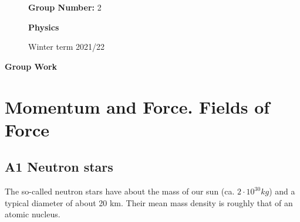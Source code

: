 \documentclass[10pt,ngerman]{scrartcl}
\begin{document}
\begin{figure}[htbp]
\begin{minipage}[b]{0.50\linewidth}
\begin{Large}
	\textbf{Group Number:} 2\newline\newline
\end{Large}
\end{minipage}
\begin{minipage}[b]{0.50\linewidth}
\begin{flushright}
\begin{Huge}
\textbf{Physics}\\
\end{Huge}
\vspace{0.5cm}
\begin{large}
Winter term 2021/22
\end{large}
\end{flushright}
\end{minipage}
\end{figure}

\vspace{2cm}
\begin{huge}
\noindent

\textbf{Group Work}
\end{huge}

\section{Momentum and Force. Fields of Force}
\subsection{A1 Neutron stars}
The so-called neutron stars have about the mass of our sun (ca. $2 \cdot 10^{30}kg$) and a typical diameter of about 20 km. Their mean mass density is roughly that of an atomic nucleus.
\end{document}
